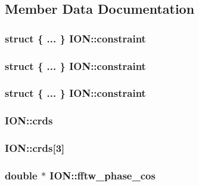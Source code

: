 \subsection{Member Data Documentation}
\hypertarget{struct_i_o_n_a16d5ff101c1a5fc8ac100fc67d68026e}{
\subsubsection[{constraint}]{\setlength{\rightskip}{0pt plus 5cm}struct \{ ... \}   I\-O\-N\-::constraint}}\label{struct_i_o_n_a16d5ff101c1a5fc8ac100fc67d68026e}
\hypertarget{struct_i_o_n_aaf5b4e252a283fc0dbd2352dc69d7c32}{
\subsubsection[{constraint}]{\setlength{\rightskip}{0pt plus 5cm}struct \{ ... \}   I\-O\-N\-::constraint}}\label{struct_i_o_n_aaf5b4e252a283fc0dbd2352dc69d7c32}
\hypertarget{struct_i_o_n_a54bc163445c13e74a88aea0f4cad79c2}{
\subsubsection[{constraint}]{\setlength{\rightskip}{0pt plus 5cm}struct \{ ... \}   I\-O\-N\-::constraint}}\label{struct_i_o_n_a54bc163445c13e74a88aea0f4cad79c2}
\hypertarget{struct_i_o_n_af27f63068a76a2bcf1d5740f524f0425}{
\subsubsection[{crds}]{ I\-O\-N\-::crds}}\label{struct_i_o_n_af27f63068a76a2bcf1d5740f524f0425}
\hypertarget{struct_i_o_n_a3d8e23138312388ebbca43302375a03e}{
\subsubsection[{crds}]{ I\-O\-N\-::crds\mbox{[}3\mbox{]}}}\label{struct_i_o_n_a3d8e23138312388ebbca43302375a03e}
\hypertarget{struct_i_o_n_a6795be4aa977f37e747a1012c680cdc3}{
\subsubsection[{fftw\-\_\-phase\-\_\-cos}]{\setlength{\rightskip}{0pt plus 5cm}double $\ast$ I\-O\-N\-::fftw\-\_\-phase\-\_\-cos}}\label{struct_i_o_n_a6795be4aa977f37e747a1012c680cdc3}
